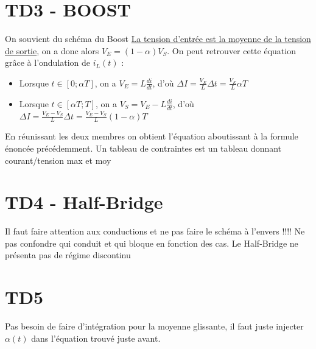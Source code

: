 \documentclass[french,10pt,a4paper]{article}
\begin{document}
\section{TD3 - BOOST}
On souvient du schéma du Boost\newline
\underline{La tension d'entrée est la moyenne de la tension de sortie}, on a donc alors $V_E = (1-\alpha)V_S$.
On peut retrouver cette équation grâce à l'ondulation de $i_L(t)$ :
\begin{itemize}
	\item Lorsque $t\in[0;{\alpha}T]$, on a $V_E = L\frac{di}{dt}$, d'où $\Delta{I} = \frac{V_E}{L}\Delta{t} = \frac{V_E}{L}{\alpha}T$
	\item Lorsque $t\in[{\alpha}T;T]$, on a $V_{S}=V_E - L\frac{di}{dt}$, d'où $\Delta{I} = \frac{V_E-V_S}{L}\Delta{t} = \frac{V_E-V_S}{L}(1-\alpha){T}$
\end{itemize}
En réunissant les deux membres on obtient l'équation aboutissant à la formule énoncée précédemment.\newline
Un tableau de contraintes est un tableau donnant  courant/tension max et moy
\section{TD4 - Half-Bridge}
Il faut faire attention aux conductions et ne pas faire le schéma à l'envers !!!! Ne pas confondre qui conduit et qui bloque en fonction des cas.\newline
Le Half-Bridge ne présenta pas de régime discontinu	
\section{TD5}
Pas besoin de faire d'intégration pour la moyenne glissante, il faut juste injecter $\alpha(t)$ dans l'équation trouvé juste avant.\newline
\end{document}

